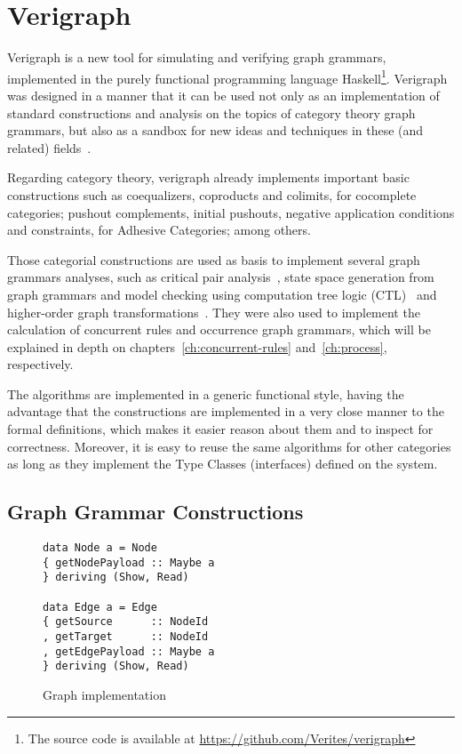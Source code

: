 \chapter{Verigraph}\label{ch:verigraph}

Verigraph is a new tool for simulating and verifying graph grammars, implemented in the purely functional programming language Haskell\footnote{The source code is available at \url{https://github.com/Verites/verigraph}}. Verigraph was designed in a manner that it can be used not only as an implementation of standard constructions and analysis on the topics of category theory graph grammars, but also as a sandbox for new ideas and techniques in these (and related) fields~\cite{BezerraETMF2016,Costa2016,CostaETMF2016, Becker2014}.

Regarding category theory, verigraph already implements important basic constructions such as coequalizers, coproducts and colimits, for cocomplete categories; pushout complements, initial pushouts, negative application conditions and constraints, for Adhesive Categories; among others.

Those categorial constructions are used as basis to implement several graph grammars analyses, such as critical pair analysis~\cite{Lambers2006}, state space generation from graph grammars and model checking using computation tree logic (CTL)~\cite{Becker2014} and higher-order graph transformations~\cite{Machado2015}. They were also used to implement the calculation of concurrent rules and occurrence graph grammars, which will be explained in depth on chapters~\ref{ch:concurrent-rules}
and~\ref{ch:process}, respectively.

The algorithms are implemented in a generic functional style, having the advantage that the constructions are implemented in a very close manner to the formal definitions, which makes it easier reason about them and to inspect for correctness. Moreover, it is easy to reuse the same algorithms for other categories as long as they implement the Type Classes (interfaces) defined on the system.

\section{Graph Grammar Constructions}

\begin{figure}[!ht]

\caption{Graph implementation}
\begin{verbatim}
data Node a = Node 
{ getNodePayload :: Maybe a
} deriving (Show, Read)

data Edge a = Edge 
{ getSource      :: NodeId
, getTarget      :: NodeId
, getEdgePayload :: Maybe a
} deriving (Show, Read)
\end{verbatim}
\end{figure}

